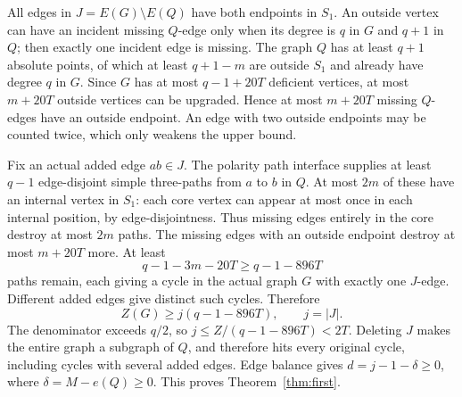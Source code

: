 \documentclass[11pt]{article}
\theoremstyle{remark}\newtheorem*{remark}{Remark}
\begin{document}
All edges in $J=E(G)\setminus E(Q)$ have both endpoints in $S_1$. An outside vertex can have an incident missing $Q$-edge only when its degree is $q$ in $G$ and $q+1$ in $Q$; then exactly one incident edge is missing. The graph $Q$ has at least $q+1$ absolute points, of which at least $q+1-m$ are outside $S_1$ and already have degree $q$ in $G$. Since $G$ has at most $q-1+20T$ deficient vertices, at most $m+20T$ outside vertices can be upgraded. Hence at most $m+20T$ missing $Q$-edges have an outside endpoint. An edge with two outside endpoints may be counted twice, which only weakens the upper bound.

Fix an actual added edge $ab\in J$. The polarity path interface supplies at least $q-1$ edge-disjoint simple three-paths from $a$ to $b$ in $Q$. At most $2m$ of these have an internal vertex in $S_1$: each core vertex can appear at most once in each internal position, by edge-disjointness. Thus missing edges entirely in the core destroy at most $2m$ paths. The missing edges with an outside endpoint destroy at most $m+20T$ more. At least
\[
 q-1-3m-20T\geq q-1-896T
\]
paths remain, each giving a cycle in the actual graph $G$ with exactly one $J$-edge. Different added edges give distinct such cycles. Therefore
\begin{equation}\label{eq:retain}
 Z(G)\geq j(q-1-896T),\qquad j=|J|.
\end{equation}
The denominator exceeds $q/2$, so $j\leq Z/(q-1-896T)<2T$. Deleting $J$ makes the entire graph a subgraph of $Q$, and therefore hits every original cycle, including cycles with several added edges.
Edge balance gives $d=j-1-\delta\geq0$, where $\delta=M-e(Q)\geq0$.
This proves Theorem~\ref{thm:first}.
\end{document}
